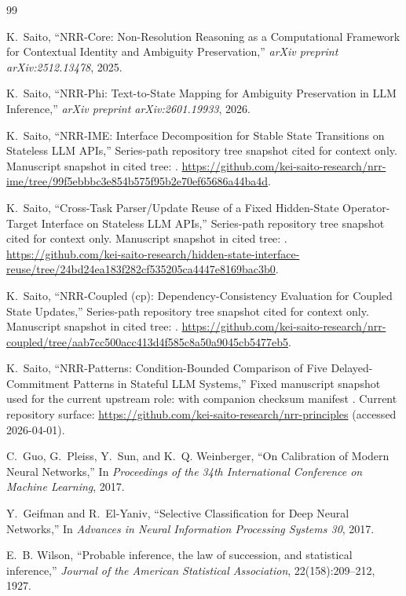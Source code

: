 \documentclass[11pt,a4paper]{article}
\begin{document}
\begin{thebibliography}{99}
\raggedright

K.~Saito,
\newblock ``NRR-Core: Non-Resolution Reasoning as a Computational Framework for Contextual Identity and Ambiguity Preservation,''
\newblock \emph{arXiv preprint arXiv:2512.13478}, 2025.

K.~Saito,
\newblock ``NRR-Phi: Text-to-State Mapping for Ambiguity Preservation in LLM Inference,''
\newblock \emph{arXiv preprint arXiv:2601.19933}, 2026.

K.~Saito,
\newblock ``NRR-IME: Interface Decomposition for Stable State Transitions on Stateless LLM APIs,''
\newblock Series-path repository tree snapshot cited for context only. Manuscript snapshot in cited tree:
. \url{https://github.com/kei-saito-research/nrr-ime/tree/99f5ebbbc3e854b575f95b2e70ef65686a44ba4d}.

K.~Saito,
\newblock ``Cross-Task Parser/Update Reuse of a Fixed Hidden-State Operator-Target Interface on Stateless LLM APIs,''
\newblock Series-path repository tree snapshot cited for context only. Manuscript snapshot in cited tree:
. \url{https://github.com/kei-saito-research/hidden-state-interface-reuse/tree/24bd24ea183f282cf535205ca4447e8169bac3b0}.

K.~Saito,
\newblock ``NRR-Coupled (cp): Dependency-Consistency Evaluation for Coupled State Updates,''
\newblock Series-path repository tree snapshot cited for context only. Manuscript snapshot in cited tree:
.
\url{https://github.com/kei-saito-research/nrr-coupled/tree/aab7cc500acc413d4f585c8a50a9045cb5477eb5}.

K.~Saito,
\newblock ``NRR-Patterns: Condition-Bounded Comparison of Five Delayed-Commitment Patterns in Stateful LLM Systems,''
\newblock Fixed manuscript snapshot used for the current upstream role:
with companion checksum manifest
.
Current repository surface: \url{https://github.com/kei-saito-research/nrr-principles} (accessed 2026-04-01).

C.~Guo, G.~Pleiss, Y.~Sun, and K.~Q. Weinberger,
\newblock ``On Calibration of Modern Neural Networks,''
\newblock In \emph{Proceedings of the 34th International Conference on Machine Learning}, 2017.

Y.~Geifman and R.~El-Yaniv,
\newblock ``Selective Classification for Deep Neural Networks,''
\newblock In \emph{Advances in Neural Information Processing Systems 30}, 2017.

E.~B. Wilson,
\newblock ``Probable inference, the law of succession, and statistical inference,''
\newblock \emph{Journal of the American Statistical Association}, 22(158):209--212, 1927.

\end{thebibliography}
\end{document}
